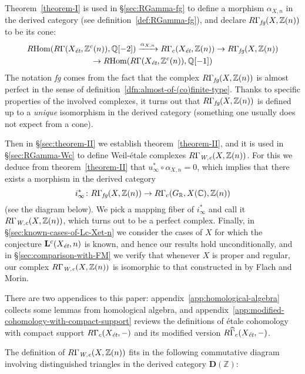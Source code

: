 \documentclass[leqno,12pt]{article}
\theoremstyle{plain}
\theoremstyle{definition}
\DeclareMathOperator{\Hom}{Hom}
\newcommand{\CC}{\mathbb{C}}
\newcommand{\QQ}{\mathbb{Q}}
\newcommand{\RR}{\mathbb{R}}
\newcommand{\ZZ}{\mathbb{Z}}
\newcommand{\Wc}{\text{\it W,c}}
\newcommand{\et}{\text{\it \'{e}t}}
\newcommand{\fg}{\text{\it fg}}
\newcommand{\RHom}{R\!\Hom}
\begin{document}
Theorem~\ref{theorem-I} is used in \S\ref{sec:RGamma-fg} to define a morphism
$\alpha_{X,n}$ in the derived category (see definition~\ref{def:RGamma-fg}),
and declare $R\Gamma_\fg (X, \ZZ(n))$ to be its cone:
\begin{multline*}
  \RHom (R\Gamma (X_\et, \ZZ^c (n)), \QQ [-2]) \xrightarrow{\alpha_{X,n}}
  R\Gamma_c (X_\et, \ZZ (n)) \to
  R\Gamma_\fg (X, \ZZ(n)) \\
  \to \RHom (R\Gamma (X_\et, \ZZ^c (n)), \QQ [-1])
\end{multline*}
The notation \emph{fg} comes from the fact that the complex
$R\Gamma_\fg (X, \ZZ(n))$ is almost perfect in the sense of
definition~\ref{dfn:almost-of-(co)finite-type}. Thanks to specific properties
of the involved complexes, it turns out that $R\Gamma_\fg (X, \ZZ(n))$ is
defined up to a \emph{unique} isomorphism in the derived category (something one
usually does not expect from a cone).

Then in \S\ref{sec:theorem-II} we establish theorem~\ref{theorem-II}, and it is
used in \S\ref{sec:RGamma-Wc} to define Weil-\'{e}tale complexes
$R\Gamma_\Wc (X, \ZZ(n))$. For this we deduce from theorem~\ref{theorem-II} that
$u_\infty^* \circ \alpha_{X,n} = 0$, which implies that there exists a morphism
in the derived category
$$i_\infty^*\colon R\Gamma_\fg (X, \ZZ (n)) \to R\Gamma_c (G_\RR, X (\CC), \ZZ(n))$$
(see the diagram below). We pick a mapping fiber of $i_\infty^*$ and call it
$R\Gamma_\Wc (X, \ZZ (n))$, which turns out to be a perfect complex.
Finally, in \S\ref{sec:known-cases-of-Lc-Xet-n} we consider the cases of $X$ for
which the conjecture $\mathbf{L}^c (X_\et, n)$ is known, and hence our results
hold unconditionally, and in \S\ref{sec:comparison-with-FM} we verify that
whenever $X$ is proper and regular, our complex $R\Gamma_\Wc (X, \ZZ (n))$ is
isomorphic to that constructed in \cite{Flach-Morin-2018} by Flach and Morin.

There are two appendices to this paper: appendix~\ref{app:homological-algebra}
collects some lemmas from homological algebra, and
appendix~\ref{app:modified-cohomology-with-compact-support} reviews the
definitions of \'{e}tale cohomology with compact support $R\Gamma_c (X_\et, -)$
and its modified version $R\widehat{\Gamma}_c (X_\et, -)$.

\vspace{1em}

The definition of $R\Gamma_\Wc (X,\ZZ(n))$ fits in the following commutative
diagram involving distinguished triangles in the derived category
$\mathbf{D} (\ZZ)$:
\end{document}

